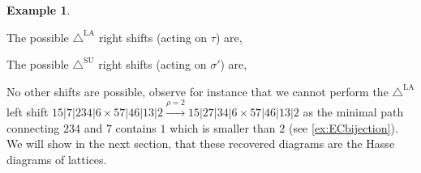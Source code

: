 \documentclass{amsart}
\theoremstyle{definition}
\newtheorem{example}[theorem]{Example}
\newcommand{\SUD}{\triangle^{\mathrm{SU}}}
\newcommand{\LAD}{\triangle^{\mathrm{LA}}}
\begin{document}
\begin{example}
\begin{center}
{
}
\end{center}
The possible $\LAD$ right shifts (acting on $\tau$)  are,
\begin{center}
\end{center}
The possible $\SUD$ right shifts (acting on $\sigma'$) are,
\begin{center}
\end{center}
No other shifts are possible, observe for instance that we cannot perform the $\LAD$ left shift $15|7|234|6 \times 57|46|13|2 \xrightarrow{\rho=2} 15|27|34|6 \times 57|46|13|2$ as the minimal path connecting $234$ and $7$ contains $1$ which is smaller than $2$ (see \cref{ex:ECbijection}).
We will show in the next section, that these recovered diagrams are the Hasse diagrams of lattices.
\end{example}
\end{document}
